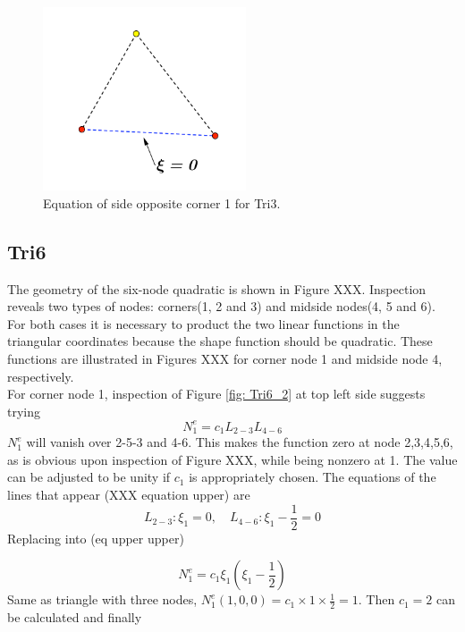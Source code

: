 \begin{figure}[h]
	\begin{center}
		\includegraphics[width=6cm,clip]{Tri3_2.pdf}			
		\caption{Equation of side opposite corner 1 for Tri3.} \label{fig: Tri3_2}
	\end{center} 
\end{figure}

\subsection{Tri6}
The geometry of the six-node quadratic is shown in Figure XXX. Inspection reveals two types of nodes: corners(1, 2 and 3) and midside nodes(4, 5 and 6). For both cases it is necessary to product the two linear functions in the triangular coordinates because the shape function should be quadratic. These functions are illustrated in Figures XXX for corner node 1 and midside node 4, respectively. \\
For corner node 1, inspection of Figure \ref{fig: Tri6_2} at top left side suggests trying
\begin{equation}
N_1^e = c_1L_{2-3}L_{4-6}
\end{equation}
$N_1^e$ will vanish over 2-5-3 and 4-6. This makes the function zero at node 2,3,4,5,6, as is obvious upon inspection of Figure XXX, while being nonzero at 1. The value can be adjusted to be unity if $c_1$ is appropriately chosen. The equations of the lines that appear (XXX equation upper) are
\begin{equation}
L_{2-3}: \xi_1 = 0, \quad L_{4-6}: \xi_1 - \frac{1}{2} = 0
\end{equation}
Replacing into (eq upper upper)

\begin{equation}
N_1^e = c_1\xi_1 \left(\xi_1 - \frac{1}{2}\right)
\end{equation}
Same as triangle with three nodes, $N_1^e\left(1,0,0\right) = c_1 \times 1 \times \frac{1}{2} = 1$. Then $c_1 = 2$ can be calculated and finally 

